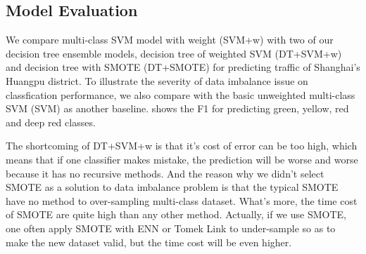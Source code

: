 %

\subsection{Model Evaluation}


We compare multi-class SVM model with weight (SVM+w) with two of 
our decision tree ensemble models, decision tree of weighted
SVM (DT+SVM+w) and decision tree with SMOTE (DT+SMOTE\cite{chawla2002smote})
for predicting traffic of Shanghai's 
Huangpu district. 
To illustrate the severity of data imbalance issue on classfication performance,
we also compare with the basic unweighted multi-class SVM (SVM) 
as another baseline.  shows the F1 for predicting
green, yellow, red and deep red classes. 

The shortcoming of DT+SVM+w is that it's cost of error can be too high, 
which means that if one classifier makes mistake, 
the prediction will be worse and worse because it has no recursive methods.  
And the reason why we didn't select SMOTE as a 
solution to data imbalance problem is that the typical SMOTE have no method 
to over-sampling multi-class dataset. 
What's more, the time cost of SMOTE are quite high than any other method. 
Actually, if we use SMOTE, one often apply SMOTE with ENN or 
Tomek Link \cite{Batista:2004:SBS:1007730.1007735} to under-sample 
so as to make the new dataset valid, but the time cost will be even higher.

